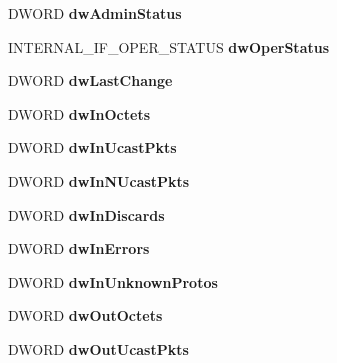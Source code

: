\begin{DoxyCompactItemize}
D\+W\+O\+RD {\bfseries dw\+Admin\+Status}
\item 
\mbox{\label{struct___m_i_b___i_f_r_o_w_a865d0bc1bb8ece5d8c52ccd0578c4a70}} 
I\+N\+T\+E\+R\+N\+A\+L\+\_\+\+I\+F\+\_\+\+O\+P\+E\+R\+\_\+\+S\+T\+A\+T\+US {\bfseries dw\+Oper\+Status}
\item 
\mbox{\label{struct___m_i_b___i_f_r_o_w_a5acb8d7a3dfeab3111b1886bbb8c34f7}} 
D\+W\+O\+RD {\bfseries dw\+Last\+Change}
\item 
\mbox{\label{struct___m_i_b___i_f_r_o_w_a564d37e87422c36fedf7d5433a65dcb5}} 
D\+W\+O\+RD {\bfseries dw\+In\+Octets}
\item 
\mbox{\label{struct___m_i_b___i_f_r_o_w_a759a8ca8ca50accd737db5bb85bfbe26}} 
D\+W\+O\+RD {\bfseries dw\+In\+Ucast\+Pkts}
\item 
\mbox{\label{struct___m_i_b___i_f_r_o_w_afb4462fd7b8b23ca31cabf305f709bbc}} 
D\+W\+O\+RD {\bfseries dw\+In\+N\+Ucast\+Pkts}
\item 
\mbox{\label{struct___m_i_b___i_f_r_o_w_a5f626d25cc20bb018eb67ae0f8d4da2c}} 
D\+W\+O\+RD {\bfseries dw\+In\+Discards}
\item 
\mbox{\label{struct___m_i_b___i_f_r_o_w_aad91f5a5c6375ee999748497b527debb}} 
D\+W\+O\+RD {\bfseries dw\+In\+Errors}
\item 
\mbox{\label{struct___m_i_b___i_f_r_o_w_ac29f90d0a31368ebbb6c32e7e0028e0c}} 
D\+W\+O\+RD {\bfseries dw\+In\+Unknown\+Protos}
\item 
\mbox{\label{struct___m_i_b___i_f_r_o_w_acea477e4fabae8afa1beffb9077a6391}} 
D\+W\+O\+RD {\bfseries dw\+Out\+Octets}
\item 
\mbox{\label{struct___m_i_b___i_f_r_o_w_af0da9e5dd6cb65859eef552f86a12c47}} 
D\+W\+O\+RD {\bfseries dw\+Out\+Ucast\+Pkts}
\item 
\mbox{\label{struct___m_i_b___i_f_r_o_w_a3b111c3918be99af7f89afdb5dfbf1f9}} 

\end{DoxyCompactItemize}
